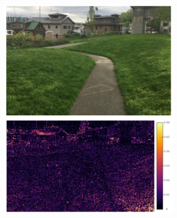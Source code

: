 \documentclass{article}
\begin{document}
\begin{figure}[h]
\centering
\begin{subfigure}{0.14\textwidth}
	\centering
    \includegraphics[width=1\linewidth]{qua_imgs/720p_240fps_1_ours.jpg}
\end{subfigure}%
\begin{subfigure}{0.14\textwidth}
	\centering

\end{subfigure}
\end{figure}
\end{document}
